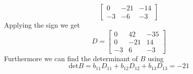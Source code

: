 \begin{enumerate}[label=\arabic*.]
\begin{mdframed}[style=MyFrame]
\begin{equation}
\begin{bmatrix}
                    0   &   -21     &       -14     \\
                    -3  &   -6      &       -3
                \end{bmatrix}
            \end{equation}
            Applying the sign we get
            \begin{equation}
                D = 
                \begin{bmatrix}
                    0   &   42      &       -35     \\
                    0   &   -21     &       14      \\
                    -3  &   6       &       -3
                \end{bmatrix}
            \end{equation}
            Furthermore we can find the determinant of $B$ using 
            \begin{equation}
                \text{det}B = 
                    b_{11}D_{11} + b_{12}D_{12} + b_{13}D_{13}
                    = -21
            \end{equation}
        \end{mdframed}


\end{enumerate}
